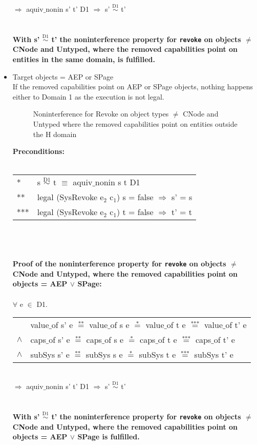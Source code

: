 \begin{itemize}
\begin{tabular}{ll}
\end{tabular} \\
$\Rightarrow$ aquiv$\_$nonin s' t' D1 $\Rightarrow$ s' $\overset{\text{D1}}{\sim}$ t' \\ \\ \\
\textbf{With s' $\overset{\text{D1}}{\sim}$ t' the noninterference property for \texttt{revoke} on objects $\neq$ CNode and Untyped, where the removed capabilities point on entities in the same domain, is fulfilled.}  
\clearpage
\item Target objects = AEP or SPage \\
If the removed capabilities point on AEP or SPage objects, nothing happens either to Domain 1 as the execution is not legal. 
\begin{flushleft}
\begin{figure}[H]
\caption{Noninterference for Revoke on object types $\neq$ CNode and Untyped where the removed capabilities point on entities outside the H domain}
\label{fig:RevokeOutside2}
\end{figure}
\end{flushleft}
\textbf{Preconditions:} \\ \\
\begin{tabular}{ll}
* & s $\overset{\text{D1}}{\sim}$ t $\equiv$ aquiv$\_$nonin s t D1	\\ 
** & legal (SysRevoke e$_2$ c$_1$) s = false $\Rightarrow$ s' = s \\ 
*** & legal (SysRevoke e$_2$ c$_1$) t = false $\Rightarrow$ t' = t
\end{tabular} \\ \\ \\
\textbf{Proof of the noninterference property for \texttt{revoke} on objects $\neq$ CNode and Untyped, where the removed capabilities point on objects = AEP $\vee$ SPage:}\\ \\
$\forall$ e $\in$ D1. \\
\begin{tabular}{ll}
& value$\_$of s' e $\overset{\text{**}}{=}$ value$\_$of s e $\overset{\text{*}}{=}$ value$\_$of t e $\overset{\text{***}}{=}$ value$\_$of t' e \\
$\wedge$ & caps$\_$of s' e $\overset{\text{**}}{=}$ caps$\_$of s e $\overset{\text{*}}{=}$ caps$\_$of t e $\overset{\text{***}}{=}$ caps$\_$of t' e \\
$\wedge$ & subSys s' e $\overset{\text{**}}{=}$ subSys s e $\overset{\text{*}}{=}$ subSys t e $\overset{\text{***}}{=}$ subSys t' e
\end{tabular} \\
$\Rightarrow$ aquiv$\_$nonin s' t' D1 $\Rightarrow$ s' $\overset{\text{D1}}{\sim}$ t' \\ \\ \\
\textbf{With s' $\overset{\text{D1}}{\sim}$ t' the noninterference property for \texttt{revoke} on objects $\neq$ CNode and Untyped, where the removed capabilities point on objects = AEP $\vee$ SPage is fulfilled.}  
\end{itemize}